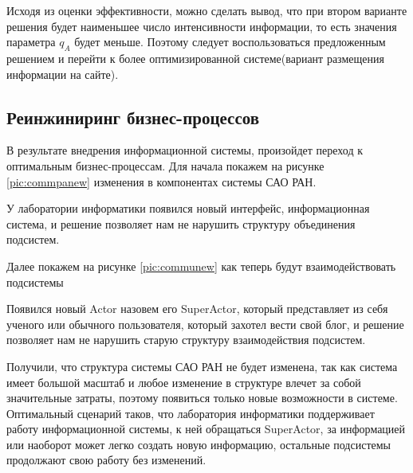 Исходя из оценки эффективности, можно сделать вывод, что при втором варианте решения будет наименьшее число интенсивности информации, то есть значения параметра $q_A$ будет меньше. Поэтому следует воспользоваться предложенным решением и перейти к более оптимизированной системе(вариант размещения информации на сайте). 

\subsection{Реинжиниринг бизнес-процессов}

В результате внедрения информационной системы, произойдет переход к оптимальным бизнес-процессам. Для начала покажем на рисунке \ref{pic:commpanew} изменения в компонентах системы САО РАН. 


У лаборатории информатики появился новый интерфейс, информационная система, и решение позволяет нам не нарушить структуру объединения подсистем. 

Далее покажем на рисунке \ref{pic:communew} как теперь будут взаимодействовать подсистемы


Появился новый Actor назовем его SuperActor, который представляет из себя ученого или обычного пользователя, который захотел вести свой блог, и решение позволяет нам не нарушить старую структуру взаимодействия подсистем.

Получили, что структура системы САО РАН не будет изменена, так как система имеет большой масштаб и любое изменение в структуре влечет за собой значительные затраты, поэтому появиться только новые возможности в системе. Оптимальный сценарий таков, что лаборатория информатики поддерживает работу информационной системы, к ней обращаться SuperActor, за информацией или наоборот может легко создать новую информацию, остальные подсистемы продолжают свою работу без изменений.
\pagebreak